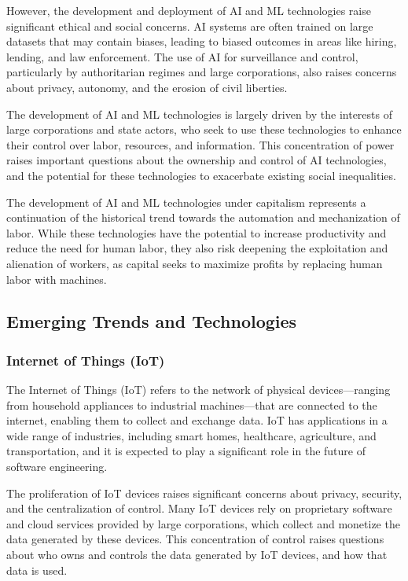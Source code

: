 \begin{refsection}
\begin{multicols}{2}
{However, the development and deployment of AI and ML technologies raise significant ethical and social concerns. AI systems are often trained on large datasets that may contain biases, leading to biased outcomes in areas like hiring, lending, and law enforcement. The use of AI for surveillance and control, particularly by authoritarian regimes and large corporations, also raises concerns about privacy, autonomy, and the erosion of civil liberties.

The development of AI and ML technologies is largely driven by the interests of large corporations and state actors, who seek to use these technologies to enhance their control over labor, resources, and information. This concentration of power raises important questions about the ownership and control of AI technologies, and the potential for these technologies to exacerbate existing social inequalities.

The development of AI and ML technologies under capitalism represents a continuation of the historical trend towards the automation and mechanization of labor. While these technologies have the potential to increase productivity and reduce the need for human labor, they also risk deepening the exploitation and alienation of workers, as capital seeks to maximize profits by replacing human labor with machines.

\subsection{Emerging Trends and Technologies}

\subsubsection{Internet of Things (IoT)}

The Internet of Things (IoT) refers to the network of physical devices—ranging from household appliances to industrial machines—that are connected to the internet, enabling them to collect and exchange data. IoT has applications in a wide range of industries, including smart homes, healthcare, agriculture, and transportation, and it is expected to play a significant role in the future of software engineering.

The proliferation of IoT devices raises significant concerns about privacy, security, and the centralization of control. Many IoT devices rely on proprietary software and cloud services provided by large corporations, which collect and monetize the data generated by these devices. This concentration of control raises questions about who owns and controls the data generated by IoT devices, and how that data is used.

}
\end{multicols}
\end{refsection}
